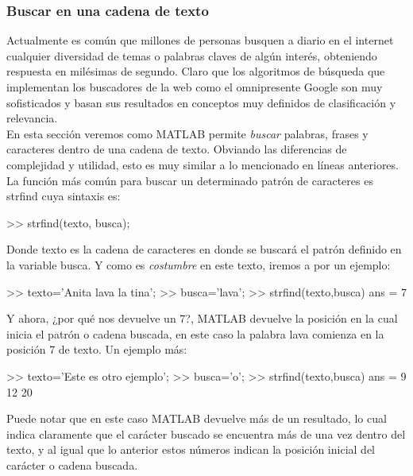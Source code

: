 \subsubsection{Buscar en una cadena de texto}\label{buscar-en-una-cadena-de-texto}

Actualmente es común que millones de personas busquen a diario en el
internet cualquier diversidad de temas o palabras claves de algún
interés, obteniendo respuesta en milésimas de segundo. Claro que los
algoritmos de búsqueda que implementan los buscadores de la web como el
omnipresente Google son muy sofisticados y basan sus resultados en
conceptos muy definidos de clasificación y relevancia. \\

En esta sección veremos como MATLAB permite \emph{buscar} palabras,
frases y caracteres dentro de una cadena de texto. Obviando las
diferencias de complejidad y utilidad, esto es muy similar a lo
mencionado en líneas anteriores. \\

La función más común para buscar un determinado patrón de caracteres es
strfind cuya sintaxis es:

\begin{matlab}
>> strfind(texto, busca);
\end{matlab}

Donde texto es la cadena de caracteres en donde se buscará el patrón
definido en la variable busca. Y como es \emph{costumbre} en este texto,
iremos a por un ejemplo:

\begin{matlab}
>> texto='Anita lava la tina';
>> busca='lava';
>> strfind(texto,busca)
ans =
     7
\end{matlab}

Y ahora, ¿por qué nos devuelve un 7?, MATLAB devuelve la posición en la
cual inicia el patrón o cadena buscada, en este caso la palabra lava
comienza en la posición 7 de texto. Un ejemplo más:

\begin{matlab}
>> texto='Este es otro ejemplo';
>> busca='o';
>> strfind(texto,busca)
ans =
     9    12    20
\end{matlab}

Puede notar que en este caso MATLAB devuelve más de un resultado, lo
cual indica claramente que el carácter buscado se encuentra más de una
vez dentro del texto, y al igual que lo anterior estos números indican
la posición inicial del carácter o cadena buscada. \\


